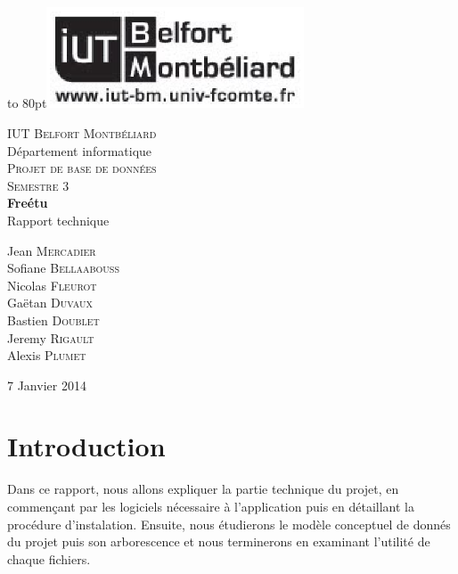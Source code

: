 \documentclass[a4paper,10pt]{report}
\begin{document}
\begin{titlepage}

\vbox to 80pt{\hfill\includegraphics[height=3cm]{logo-iut.eps}}\
\begin{center}

\textsc{\LARGE IUT Belfort Montbéliard}\\\Large D\'epartement informatique\\[1.5cm]

\textsc{\Large Projet de base de donn\'ees}\\[0.5cm]
\textsc{\Large Semestre 3}\\[5cm]


{ \huge \bfseries Fre\'etu}\\\Large Rapport technique\\[5cm]

\begin{large}
Jean \textsc{Mercadier}\\[0.3em]
Sofiane \textsc{Bellaabouss}\\[0.3em]
Nicolas \textsc{Fleurot}\\[0.3em]
Gaëtan \textsc{Duvaux}\\[0.3em]
Bastien \textsc{Doublet}\\[0.3em]
Jeremy \textsc{Rigault}\\[0.3em]
Alexis \textsc{Plumet}\\[0.3em]
\end{large}

\vfill

{\large 7 Janvier 2014}

\end{center}
\end{titlepage}

\tableofcontents

\chapter*{Introduction}

Dans ce rapport, nous allons expliquer la partie technique du projet, en commen\c{c}ant
par les logiciels n\'ecessaire \`a l'application puis en d\'etaillant la proc\'edure
d'instalation. Ensuite, nous \'etudierons le mod\`ele conceptuel de donn\'es du projet
puis son arborescence et nous terminerons en examinant l'utilit\'e de chaque fichiers.
\end{document}
